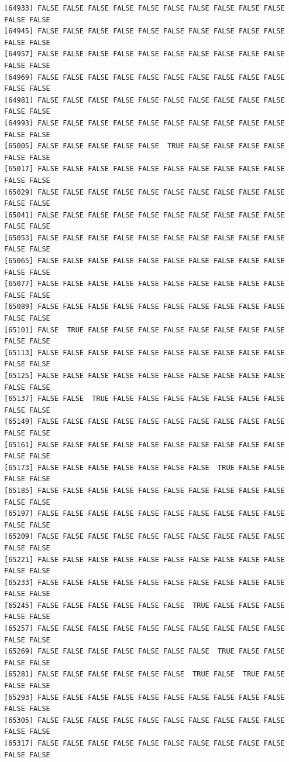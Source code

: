 \documentclass[
  a4paper,
  DIV=11,
  numbers=noendperiod]{scrartcl}
\begin{document}
\begin{verbatim}
[64933] FALSE FALSE FALSE FALSE FALSE FALSE FALSE FALSE FALSE FALSE FALSE FALSE
[64945] FALSE FALSE FALSE FALSE FALSE FALSE FALSE FALSE FALSE FALSE FALSE FALSE
[64957] FALSE FALSE FALSE FALSE FALSE FALSE FALSE FALSE FALSE FALSE FALSE FALSE
[64969] FALSE FALSE FALSE FALSE FALSE FALSE FALSE FALSE FALSE FALSE FALSE FALSE
[64981] FALSE FALSE FALSE FALSE FALSE FALSE FALSE FALSE FALSE FALSE FALSE FALSE
[64993] FALSE FALSE FALSE FALSE FALSE FALSE FALSE FALSE FALSE FALSE FALSE FALSE
[65005] FALSE FALSE FALSE FALSE FALSE  TRUE FALSE FALSE FALSE FALSE FALSE FALSE
[65017] FALSE FALSE FALSE FALSE FALSE FALSE FALSE FALSE FALSE FALSE FALSE FALSE
[65029] FALSE FALSE FALSE FALSE FALSE FALSE FALSE FALSE FALSE FALSE FALSE FALSE
[65041] FALSE FALSE FALSE FALSE FALSE FALSE FALSE FALSE FALSE FALSE FALSE FALSE
[65053] FALSE FALSE FALSE FALSE FALSE FALSE FALSE FALSE FALSE FALSE FALSE FALSE
[65065] FALSE FALSE FALSE FALSE FALSE FALSE FALSE FALSE FALSE FALSE FALSE FALSE
[65077] FALSE FALSE FALSE FALSE FALSE FALSE FALSE FALSE FALSE FALSE FALSE FALSE
[65089] FALSE FALSE FALSE FALSE FALSE FALSE FALSE FALSE FALSE FALSE FALSE FALSE
[65101] FALSE  TRUE FALSE FALSE FALSE FALSE FALSE FALSE FALSE FALSE FALSE FALSE
[65113] FALSE FALSE FALSE FALSE FALSE FALSE FALSE FALSE FALSE FALSE FALSE FALSE
[65125] FALSE FALSE FALSE FALSE FALSE FALSE FALSE FALSE FALSE FALSE FALSE FALSE
[65137] FALSE FALSE  TRUE FALSE FALSE FALSE FALSE FALSE FALSE FALSE FALSE FALSE
[65149] FALSE FALSE FALSE FALSE FALSE FALSE FALSE FALSE FALSE FALSE FALSE FALSE
[65161] FALSE FALSE FALSE FALSE FALSE FALSE FALSE FALSE FALSE FALSE FALSE FALSE
[65173] FALSE FALSE FALSE FALSE FALSE FALSE FALSE  TRUE FALSE FALSE FALSE FALSE
[65185] FALSE FALSE FALSE FALSE FALSE FALSE FALSE FALSE FALSE FALSE FALSE FALSE
[65197] FALSE FALSE FALSE FALSE FALSE FALSE FALSE FALSE FALSE FALSE FALSE FALSE
[65209] FALSE FALSE FALSE FALSE FALSE FALSE FALSE FALSE FALSE FALSE FALSE FALSE
[65221] FALSE FALSE FALSE FALSE FALSE FALSE FALSE FALSE FALSE FALSE FALSE FALSE
[65233] FALSE FALSE FALSE FALSE FALSE FALSE FALSE FALSE FALSE FALSE FALSE FALSE
[65245] FALSE FALSE FALSE FALSE FALSE FALSE  TRUE FALSE FALSE FALSE FALSE FALSE
[65257] FALSE FALSE FALSE FALSE FALSE FALSE FALSE FALSE FALSE FALSE FALSE FALSE
[65269] FALSE FALSE FALSE FALSE FALSE FALSE FALSE  TRUE FALSE FALSE FALSE FALSE
[65281] FALSE FALSE FALSE FALSE FALSE FALSE  TRUE FALSE  TRUE FALSE FALSE FALSE
[65293] FALSE FALSE FALSE FALSE FALSE FALSE FALSE FALSE FALSE FALSE FALSE FALSE
[65305] FALSE FALSE FALSE FALSE FALSE FALSE FALSE FALSE FALSE FALSE FALSE FALSE
[65317] FALSE FALSE FALSE FALSE FALSE FALSE FALSE FALSE FALSE FALSE FALSE FALSE

\end{verbatim}
\end{document}
